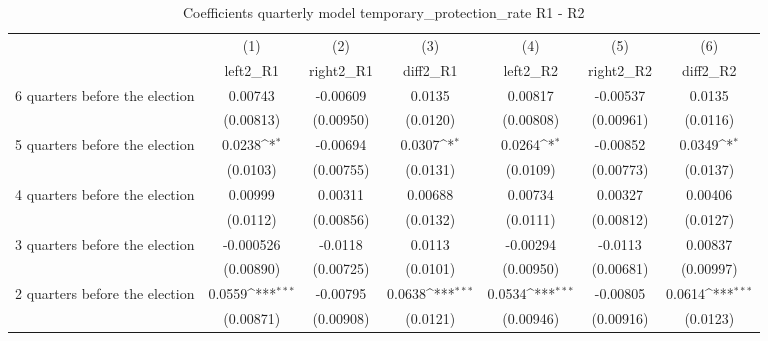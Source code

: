 \begin{table}[htbp]\centering
\def\sym#1{\ifmmode^{#1}\else\(^{#1}\)\fi}
\caption{Coefficients quarterly model temporary\_protection\_rate R1 - R2}
\begin{tabular}{l*{6}{c}}
\hline\hline
                    &\multicolumn{1}{c}{(1)}&\multicolumn{1}{c}{(2)}&\multicolumn{1}{c}{(3)}&\multicolumn{1}{c}{(4)}&\multicolumn{1}{c}{(5)}&\multicolumn{1}{c}{(6)}\\
                    &\multicolumn{1}{c}{left2\_R1}&\multicolumn{1}{c}{right2\_R1}&\multicolumn{1}{c}{diff2\_R1}&\multicolumn{1}{c}{left2\_R2}&\multicolumn{1}{c}{right2\_R2}&\multicolumn{1}{c}{diff2\_R2}\\
\hline
 6 quarters before the election&     0.00743         &    -0.00609         &      0.0135         &     0.00817         &    -0.00537         &      0.0135         \\
                    &   (0.00813)         &   (0.00950)         &    (0.0120)         &   (0.00808)         &   (0.00961)         &    (0.0116)         \\
[1em]
 5 quarters before the election&      0.0238\sym{*}  &    -0.00694         &      0.0307\sym{*}  &      0.0264\sym{*}  &    -0.00852         &      0.0349\sym{*}  \\
                    &    (0.0103)         &   (0.00755)         &    (0.0131)         &    (0.0109)         &   (0.00773)         &    (0.0137)         \\
[1em]
 4 quarters before the election&     0.00999         &     0.00311         &     0.00688         &     0.00734         &     0.00327         &     0.00406         \\
                    &    (0.0112)         &   (0.00856)         &    (0.0132)         &    (0.0111)         &   (0.00812)         &    (0.0127)         \\
[1em]
 3 quarters before the election&   -0.000526         &     -0.0118         &      0.0113         &    -0.00294         &     -0.0113         &     0.00837         \\
                    &   (0.00890)         &   (0.00725)         &    (0.0101)         &   (0.00950)         &   (0.00681)         &   (0.00997)         \\
[1em]
 2 quarters before the election&      0.0559\sym{***}&    -0.00795         &      0.0638\sym{***}&      0.0534\sym{***}&    -0.00805         &      0.0614\sym{***}\\
                    &   (0.00871)         &   (0.00908)         &    (0.0121)         &   (0.00946)         &   (0.00916)         &    (0.0123)         \\

\end{tabular}
\end{table}
